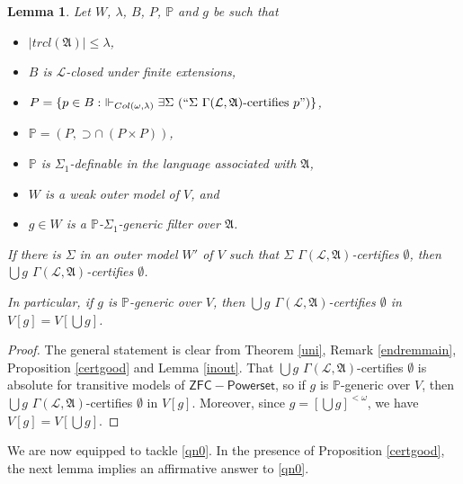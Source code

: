 \documentclass[12pt, twoside]{memoir}
\numberwithin{equation}{section}
\newtheorem{lem}[thm]{Lemma}
\theoremstyle{definition}
\theoremstyle{remark}
\theoremstyle{definition}
\theoremstyle{definition}
\theoremstyle{definition}
\theoremstyle{remark}
\begin{document}
\begin{lem}\label{main2}
Let $W$, $\lambda$, $B$, $P$, $\mathbb{P}$ and $g$ be such that
\begin{itemize}
    \item $|trcl(\mathfrak{A})| \leq \lambda$,
    \item $B$ is $\mathcal{L}$-closed under finite extensions,
    \item $P = \{p \in B : \ \Vdash_{Col(\omega, \lambda)} \exists \Sigma \ (``\Sigma \ \Gamma(\mathcal{L}, \mathfrak{A}) \text{-certifies } p")\}$,
    \item $\mathbb{P} = (P, \supset \cap \ (P \times P))$, 
    \item $\mathbb{P}$ is $\Sigma_1$-definable in the language associated with $\mathfrak{A}$,
    \item $W$ is a weak outer model of $V$, and
    \item $g \in W$ is a $\mathbb{P}$-$\Sigma_1$-generic filter over $\mathfrak{A}$.
\end{itemize}
If there is $\Sigma$ in an outer model $W'$ of $V$ such that $\Sigma$ $\Gamma(\mathcal{L}, \mathfrak{A})$-certifies $\emptyset$, then $\bigcup g$ $\Gamma(\mathcal{L}, \mathfrak{A})$-certifies $\emptyset$.

In particular, if $g$ is $\mathbb{P}$-generic over $V$, then $\bigcup g$ $\Gamma(\mathcal{L}, \mathfrak{A})$-certifies $\emptyset$ in $V[g] = V[\bigcup g]$.
\end{lem}

\begin{proof}
The general statement is clear from Theorem \ref{uni}, Remark \ref{endremmain}, Proposition \ref{certgood} and Lemma \ref{inout}. That $\bigcup g$ $\Gamma(\mathcal{L}, \mathfrak{A})$-certifies $\emptyset$ is absolute for transitive models of $\mathsf{ZFC - Powerset}$, so if $g$ is $\mathbb{P}$-generic over $V$, then  $\bigcup g$ $\Gamma(\mathcal{L}, \mathfrak{A})$-certifies $\emptyset$ in $V[g]$. Moreover, since $g = [\bigcup g]^{< \omega}$, we have $V[g] = V[\bigcup g]$.
\end{proof}

We are now equipped to tackle \ref{qn0}. In the presence of Proposition \ref{certgood}, the next lemma implies an affirmative answer to \ref{qn0}.
\end{document}
